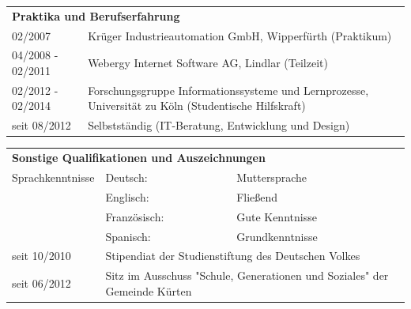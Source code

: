 \begin{flushleft}
\vspace{0.5em}

\begin{tabular}{p{11em} p{22.5em}}
    \multicolumn{2}{l}{\textbf{Praktika und Berufserfahrung}} \\
    02/2007 & Krüger Industrieautomation GmbH, Wipperfürth (Praktikum) \\
    04/2008 - 02/2011 & Webergy Internet Software AG, Lindlar (Teilzeit) \\
    02/2012 - 02/2014 & Forschungsgruppe Informationssysteme und Lernprozesse, Universität zu Köln (Studentische Hilfskraft) \\
    seit 08/2012 & Selbstständig (IT-Beratung, Entwicklung und Design) \\
\end{tabular}

\vspace{0.5em}

\begin{tabular}{p{11em} p{6em} p{16.5em}}
    \multicolumn{3}{l}{\textbf{Sonstige Qualifikationen und Auszeichnungen}} \\
    Sprachkenntnisse & Deutsch: & Muttersprache \\
    & Englisch: & Fließend \\
    & Französisch: & Gute Kenntnisse \\
    & Spanisch: & Grundkenntnisse \\
    seit 10/2010 & \multicolumn{2}{l}{Stipendiat der Studienstiftung des Deutschen Volkes} \\
    seit 06/2012 & \multicolumn{2}{p{22.5em}}{Sitz im Ausschuss "Schule, Generationen und Soziales" der Gemeinde Kürten} \\
\end{tabular}


\vspace{-1em}

\end{flushleft}